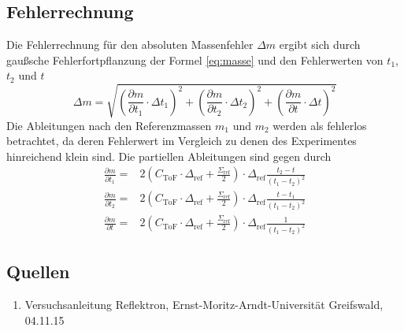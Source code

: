 \documentclass[numbers=noenddot,a4paper,notitlepage,twoside,BCOR15mm]{scrartcl}
\begin{document}
		\subsection{Fehlerrechnung}
		
		Die Fehlerrechnung für den absoluten Massenfehler $\Delta m$ ergibt sich durch gaußsche Fehlerfortpflanzung der Formel \eqref{eq:masse} und den Fehlerwerten von $t_1$,$t_2$ und $t$
		\begin{equation}
			\Delta m = \sqrt{\left(\frac{\partial m}{\partial t_1}\cdot \Delta t_1\right)^2+\left(\frac{\partial m}{\partial t_2}\cdot \Delta t_2\right)^2+\left(\frac{\partial m}{\partial t}\cdot \Delta t \right)^2}
		\end{equation}
		Die Ableitungen nach den Referenzmassen $m_1$ und $m_2$ werden als fehlerlos betrachtet, da deren Fehlerwert im Vergleich zu denen des Experimentes hinreichend klein sind. Die partiellen Ableitungen sind gegen durch
		\begin{align}
			\frac{\partial m}{\partial t_1} =& 2 \left(C_\mathrm{ToF}\cdot \Delta_\mathrm{ref}+\frac{\Sigma_\mathrm{ref}}{2}\right) \cdot \Delta_\mathrm{ref}\frac{t_2-t}{\left(t_1-t_2\right)^2} \nonumber \\
			\frac{\partial m}{\partial t_2} =& 2 \left(C_\mathrm{ToF}\cdot \Delta_\mathrm{ref}+\frac{\Sigma_\mathrm{ref}}{2}\right) \cdot \Delta_\mathrm{ref}\frac{t-t_1}{\left(t_1-t_2\right)^2} \\
			\frac{\partial m}{\partial t} =& 2 \left(C_\mathrm{ToF}\cdot \Delta_\mathrm{ref}+\frac{\Sigma_\mathrm{ref}}{2}\right) \cdot \Delta_\mathrm{ref}\frac{1}{\left(t_1-t_2\right)^2} \nonumber
		\end{align}

		\subsection{Quellen}
		\begin{enumerate}
			 \item Versuchsanleitung Reflektron, Ernst-Moritz-Arndt-Universität Greifswald, 04.11.15
		\end{enumerate}
\end{document}
